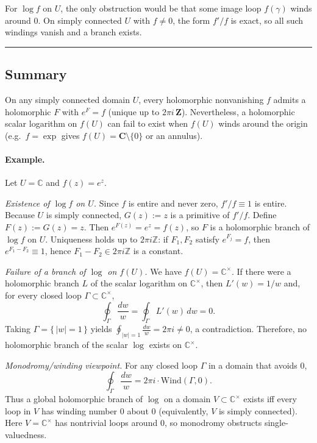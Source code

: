 \documentclass[11pt]{article}
\begin{document}
\medskip

\noindent For $\log f$ on $U$, the only obstruction would be that some image loop $f(\gamma)$ winds around $0$. On simply connected $U$ with $f\neq 0$, the form $f'/f$ is exact, so all such windings vanish and a branch exists.

\bigskip\hrule\bigskip

\subsection*{Summary}

\medskip

\noindent On any simply connected domain $U$, every holomorphic nonvanishing $f$ admits a holomorphic $F$ with $e^{F}=f$ (unique up to $2\pi i\,\mathbf{Z}$). Nevertheless, a holomorphic scalar logarithm on $f(U)$ can fail to exist when $f(U)$ winds around the origin (e.g.\ $f=\exp$ gives $f(U)=\mathbf{C}\setminus\{0\}$ or an annulus).


\paragraph{Example.} Let $U=\mathbb{C}$ and $f(z)=e^{z}$.

\emph{Existence of $\log f$ on $U$.}
Since $f$ is entire and never zero, $f'/f\equiv 1$ is entire.
Because $U$ is simply connected, $G(z):=z$ is a primitive of $f'/f$.
Define $F(z):=G(z)=z$. Then $e^{F(z)}=e^{z}=f(z)$, so $F$ is a holomorphic branch of $\log f$ on $U$.
Uniqueness holds up to $2\pi i\mathbb{Z}$: if $F_1,F_2$ satisfy $e^{F_j}=f$, then $e^{F_1-F_2}\equiv 1$, hence $F_1-F_2\in 2\pi i\mathbb{Z}$ is a constant.

\medskip

\emph{Failure of a branch of $\log$ on $f(U)$.}
We have $f(U)=\mathbb{C}^\times$.
If there were a holomorphic branch $L$ of the scalar logarithm on $\mathbb{C}^\times$, then $L'(w)=1/w$ and, for every closed loop $\Gamma\subset\mathbb{C}^\times$,
\[
\oint_{\Gamma}\frac{dw}{w}=\oint_{\Gamma}L'(w)\,dw=0.
\]
Taking $\Gamma=\{\,|w|=1\,\}$ yields $\displaystyle\oint_{|w|=1}\frac{dw}{w}=2\pi i\neq 0$, a contradiction.
Therefore, no holomorphic branch of the scalar $\log$ exists on $\mathbb{C}^\times$.

\medskip

\emph{Monodromy/winding viewpoint.}
For any closed loop $\Gamma$ in a domain that avoids $0$,
\[
\oint_{\Gamma}\frac{dw}{w}=2\pi i\cdot \mathrm{Wind}(\Gamma,0).
\]
Thus a global holomorphic branch of $\log$ on a domain $V\subset\mathbb{C}^\times$ exists iff every loop in $V$ has winding number $0$ about $0$ (equivalently, $V$ is simply connected).
Here $V=\mathbb{C}^\times$ has nontrivial loops around $0$, so monodromy obstructs single-valuedness.
\end{document}
